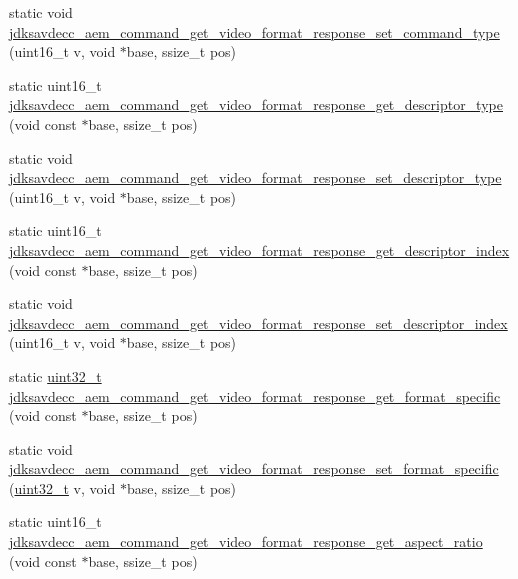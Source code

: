 \begin{DoxyCompactItemize}
static void \hyperlink{group__command__get__video__format__response_ga78bd5b2bb8334ff51f08f7c76d63ab03}{jdksavdecc\+\_\+aem\+\_\+command\+\_\+get\+\_\+video\+\_\+format\+\_\+response\+\_\+set\+\_\+command\+\_\+type} (uint16\+\_\+t v, void $\ast$base, ssize\+\_\+t pos)
\item 
static uint16\+\_\+t \hyperlink{group__command__get__video__format__response_ga7ae8e544fb2e43c27b5c3ec61dd3f9b1}{jdksavdecc\+\_\+aem\+\_\+command\+\_\+get\+\_\+video\+\_\+format\+\_\+response\+\_\+get\+\_\+descriptor\+\_\+type} (void const $\ast$base, ssize\+\_\+t pos)
\item 
static void \hyperlink{group__command__get__video__format__response_gaa385818dd855631a728c438740ff3cfd}{jdksavdecc\+\_\+aem\+\_\+command\+\_\+get\+\_\+video\+\_\+format\+\_\+response\+\_\+set\+\_\+descriptor\+\_\+type} (uint16\+\_\+t v, void $\ast$base, ssize\+\_\+t pos)
\item 
static uint16\+\_\+t \hyperlink{group__command__get__video__format__response_ga0e021f1956625ac8bb870b6e95929fa9}{jdksavdecc\+\_\+aem\+\_\+command\+\_\+get\+\_\+video\+\_\+format\+\_\+response\+\_\+get\+\_\+descriptor\+\_\+index} (void const $\ast$base, ssize\+\_\+t pos)
\item 
static void \hyperlink{group__command__get__video__format__response_ga17a5b9d4c5b74500b8b1bfa38213cfd9}{jdksavdecc\+\_\+aem\+\_\+command\+\_\+get\+\_\+video\+\_\+format\+\_\+response\+\_\+set\+\_\+descriptor\+\_\+index} (uint16\+\_\+t v, void $\ast$base, ssize\+\_\+t pos)
\item 
static \hyperlink{parse_8c_a6eb1e68cc391dd753bc8ce896dbb8315}{uint32\+\_\+t} \hyperlink{group__command__get__video__format__response_ga913ab2795ccf555f826d2656e50d2bb1}{jdksavdecc\+\_\+aem\+\_\+command\+\_\+get\+\_\+video\+\_\+format\+\_\+response\+\_\+get\+\_\+format\+\_\+specific} (void const $\ast$base, ssize\+\_\+t pos)
\item 
static void \hyperlink{group__command__get__video__format__response_ga24ab8c41c32065b24325d3bca0ffea1b}{jdksavdecc\+\_\+aem\+\_\+command\+\_\+get\+\_\+video\+\_\+format\+\_\+response\+\_\+set\+\_\+format\+\_\+specific} (\hyperlink{parse_8c_a6eb1e68cc391dd753bc8ce896dbb8315}{uint32\+\_\+t} v, void $\ast$base, ssize\+\_\+t pos)
\item 
static uint16\+\_\+t \hyperlink{group__command__get__video__format__response_ga118dba39d72903a46a3b8394f396878b}{jdksavdecc\+\_\+aem\+\_\+command\+\_\+get\+\_\+video\+\_\+format\+\_\+response\+\_\+get\+\_\+aspect\+\_\+ratio} (void const $\ast$base, ssize\+\_\+t pos)

\end{DoxyCompactItemize}
